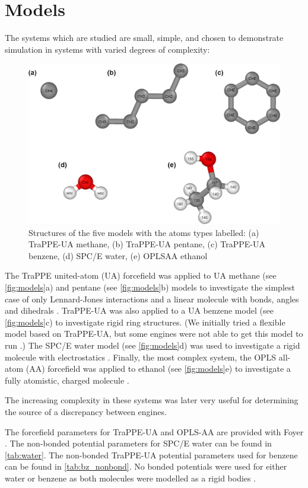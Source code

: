 \section{Models}
The systems which are studied are small, simple, and chosen to demonstrate simulation in systems with varied degrees of complexity:
\begin{figure}[h!]
    \centering
    \includegraphics[width=\linewidth]{figures/rep_study/models.png}
    \caption{Structures of the five models with the atoms types labelled: (a) TraPPE-UA methane, (b) TraPPE-UA pentane, (c) TraPPE-UA benzene, (d) SPC/E water, (e) OPLSAA ethanol}\label{fig:models}
\end{figure}
The TraPPE united-atom (UA) forcefield was applied to UA methane (see \autoref{fig:models}a) and pentane (see \autoref{fig:models}b) models to investigate the simplest case of only Lennard-Jones interactions and a linear molecule with bonds, angles and dihedrals \citep{Martin1998}.
TraPPE-UA was also applied to a UA benzene model (see \autoref{fig:models}c) to investigate rigid ring structures.
(We initially tried a flexible model based on TraPPE-UA, but some engines were not able to get this model to run \citep{Yiannourakou2019}.)
The SPC/E water model (see \autoref{fig:models}d) was used to investigate a rigid molecule with electrostatics \citep{Berendsen1987a}.
Finally, the most complex system, the OPLS all-atom (AA) forcefield was applied to ethanol (see \autoref{fig:models}e) to investigate a fully atomistic, charged molecule \citep{Jorgensen1988}.

The increasing complexity in these systems was later very useful for determining the source of a discrepancy between engines.

The forcefield parameters for TraPPE-UA and OPLS-AA are provided with Foyer \citep{foyer}. 
The non-bonded potential parameters for SPC/E water can be found in \autoref{tab:water}. 
The non-bonded TraPPE-UA potential parameters used for benzene can be found in \autoref{tab:bz_nonbond}. No bonded potentials were used for either water or benzene as both molecules were modelled as a rigid bodies \citep{Nguyen2011a, Glaser2020a}. 

